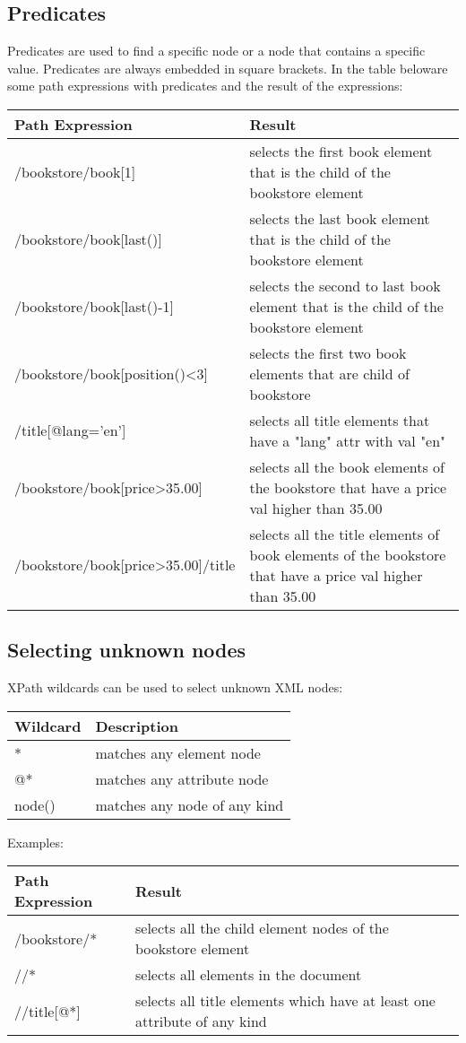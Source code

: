 \documentclass[11pt]{article}
\begin{document}
\subsection{Predicates}
\label{sec:org303e8bf}
Predicates are used to find a specific node or a node that contains a specific value.
Predicates are always embedded in square brackets.
In the table beloware some path expressions with predicates and the result of the expressions:
\begin{center}
\begin{tabular}{ll}
Path Expression & Result\\
\hline
/bookstore/book[1] & selects the first book element that is the child of the bookstore element\\
/bookstore/book[last()] & selects the last book element that is the child of the bookstore element\\
/bookstore/book[last()-1] & selects the second to last book element that is the child of the bookstore element\\
/bookstore/book[position()<3] & selects the first two book elements that are child of bookstore\\
/title[@lang='en'] & selects all title elements that have a "lang" attr with val "en"\\
/bookstore/book[price>35.00] & selects all the book elements of the bookstore that have a price val higher than 35.00\\
/bookstore/book[price>35.00]/title & selects all the title elements of book elements of the bookstore that have a price val higher than 35.00\\
\end{tabular}
\end{center}

\subsection{Selecting unknown nodes}
\label{sec:org8b6d85b}
XPath wildcards can be used to select unknown XML nodes:
\begin{center}
\begin{tabular}{ll}
Wildcard & Description\\
\hline
* & matches any element node\\
@* & matches any attribute node\\
node() & matches any node of any kind\\
\end{tabular}
\end{center}
Examples:
\begin{center}
\begin{tabular}{ll}
Path Expression & Result\\
\hline
/bookstore/* & selects all the child element nodes of the bookstore element\\
//* & selects all elements in the document\\
//title[@*] & selects all title elements which have at least one attribute of any kind\\
\end{tabular}
\end{center}
\end{document}
